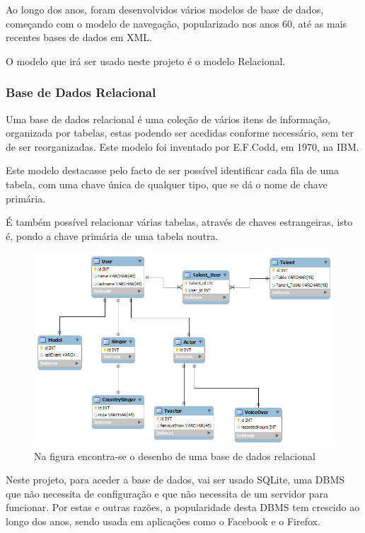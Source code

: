 \documentclass{report}
\begin{document}
Ao longo dos anos, foram desenvolvidos vários modelos de base de dados, começando com o modelo de navegação, popularizado nos anos 60, até as mais recentes bases de dados em XML.

O modelo que irá ser usado neste projeto é o modelo Relacional.

\subsubsection{Base de Dados Relacional}
Uma base de dados relacional é uma coleção de vários itens de informação, organizada por tabelas, estas podendo ser acedidas conforme necessário, sem ter de ser reorganizadas. Este modelo foi inventado por E.F.Codd, em 1970, na IBM. 

Este modelo destacasse pelo facto de ser possível identificar cada fila de uma tabela, com uma chave única de qualquer tipo, que se dá o nome de chave primária.

É também possível relacionar várias tabelas, através de chaves estrangeiras, isto é, pondo a chave primária de uma tabela noutra.
\begin{figure}[!htb]
\label{fig.dbrel}
\centering
\includegraphics[scale=0.2]{DBRel}
\caption[Ilustração de uma base de dados relacional]{Na figura encontra-se o desenho de uma base de dados relacional}
\end{figure}

Neste projeto, para aceder a base de dados, vai ser usado SQLite, uma DBMS que não necessita de configuração e que não necessita de um servidor para funcionar. Por estas e outras razões, a popularidade desta DBMS tem crescido ao longo dos anos, sendo usada em aplicações como o Facebook e o Firefox.
\end{document}
